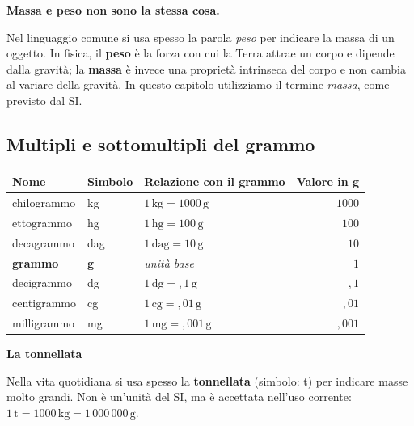 \begin{attenzione}
    \textbf{Massa e peso non sono la stessa cosa.}

    Nel linguaggio comune si usa spesso la parola \emph{peso} per indicare la massa di un oggetto. In fisica, il \textbf{peso} è la forza con cui la Terra attrae un corpo e dipende dalla gravità; la \textbf{massa} è invece una proprietà intrinseca del corpo e non cambia al variare della gravità. In questo capitolo utilizziamo il termine \emph{massa}, come previsto dal SI.
\end{attenzione}

\subsection{Multipli e sottomultipli del grammo}

\begin{center}
    \begin{tabular}{lllr}
        \toprule
        \textbf{Nome}   & \textbf{Simbolo} & \textbf{Relazione con il grammo}  & \textbf{Valore in g} \\
        \midrule
        chilogrammo     & kg               & $1\,\text{kg} = 1000\,\text{g}$   & $1000$               \\
        ettogrammo      & hg               & $1\,\text{hg} = 100\,\text{g}$    & $100$                \\
        decagrammo      & dag              & $1\,\text{dag} = 10\,\text{g}$    & $10$                 \\
        \textbf{grammo} & \textbf{g}       & \textit{unità base}               & $1$                  \\
        decigrammo      & dg               & $1\,\text{dg} = {,}1\,\text{g}$   & ${,}1$               \\
        centigrammo     & cg               & $1\,\text{cg} = {,}01\,\text{g}$  & ${,}01$              \\
        milligrammo     & mg               & $1\,\text{mg} = {,}001\,\text{g}$ & ${,}001$             \\
        \bottomrule
    \end{tabular}
\end{center}

\begin{sapevi}
    \textbf{La tonnellata}

    Nella vita quotidiana si usa spesso la \textbf{tonnellata} (simbolo: t) per indicare masse molto grandi. Non è un'unità del SI, ma è accettata nell'uso corrente: $1\,\text{t} = 1000\,\text{kg} = 1\,000\,000\,\text{g}$.
\end{sapevi}

